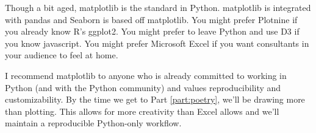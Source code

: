 Though a bit aged, matplotlib is the standard in Python. matplotlib is integrated with pandas and Seaborn is based off matplotlib. You might prefer Plotnine if you already know R's ggplot2. You might prefer to leave Python and use D3 if you know javascript. You might prefer Microsoft Excel if you want consultants in your audience to feel at home.

I recommend matplotlib to anyone who is already committed to working in Python (and with the Python community) and values reproducibility and customizability. By the time we get to Part \ref{part:poetry}, we'll be drawing more than plotting. This allows for more creativity than Excel allows and we'll maintain a reproducible Python-only workflow. 